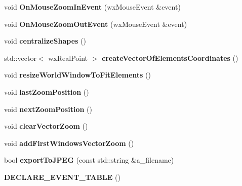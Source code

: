 \begin{DoxyCompactItemize}
\item 
void {\bf On\+Mouse\+Zoom\+In\+Event} (wx\+Mouse\+Event \&event)
\item 
void {\bf On\+Mouse\+Zoom\+Out\+Event} (wx\+Mouse\+Event \&event)
\item 
void {\bf centralize\+Shapes} ()
\item 
std\+::vector$<$ wx\+Real\+Point $>$ {\bf create\+Vector\+Of\+Elements\+Coordinates} ()
\item 
void {\bf resize\+World\+Window\+To\+Fit\+Elements} ()
\item 
void {\bf last\+Zoom\+Position} ()
\item 
void {\bf next\+Zoom\+Position} ()
\item 
void {\bf clear\+Vector\+Zoom} ()
\item 
void {\bf add\+First\+Windows\+Vector\+Zoom} ()
\item 
bool {\bf export\+To\+J\+P\+EG} (const std\+::string \&a\+\_\+filename)
\item 
{\bf D\+E\+C\+L\+A\+R\+E\+\_\+\+E\+V\+E\+N\+T\+\_\+\+T\+A\+B\+LE} ()
\end{DoxyCompactItemize}
